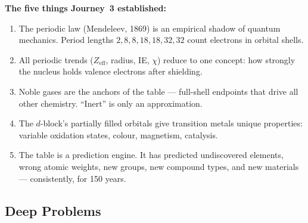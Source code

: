\documentclass[12pt, a4paper]{book}
\begin{document}
\begin{synthbox}
\medskip
\textbf{The five things Journey~3 established:}
\begin{enumerate}[nosep, leftmargin=2em]
  \item The periodic law (Mendeleev, 1869) is an empirical
        shadow of quantum mechanics.
        Period lengths $2,8,8,18,18,32,32$ count electrons
        in orbital shells.
  \item All periodic trends ($Z_\text{eff}$, radius, IE, $\chi$)
        reduce to one concept: how strongly the nucleus
        holds valence electrons after shielding.
  \item Noble gases are the anchors of the table ---
        full-shell endpoints that drive all other chemistry.
        ``Inert'' is only an approximation.
  \item The $d$-block's partially filled orbitals give
        transition metals unique properties: variable
        oxidation states, colour, magnetism, catalysis.
  \item The table is a prediction engine.
        It has predicted undiscovered elements,
        wrong atomic weights, new groups, new compound types,
        and new materials --- consistently, for 150 years.
\end{enumerate}
\end{synthbox}

\subsection*{Deep Problems}
\end{document}
